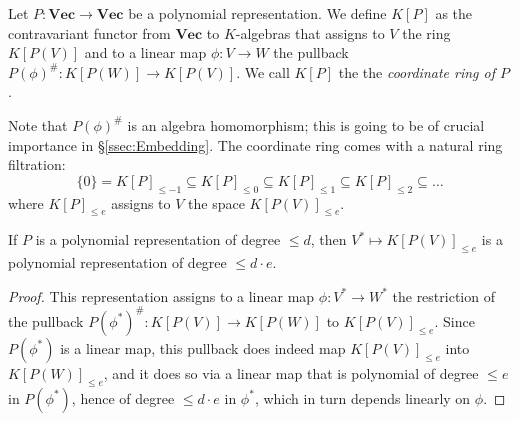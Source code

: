 \documentclass{amsart}
\renewcommand{\Vec}{\mathbf{Vec}}
\begin{document}
\begin{de}
Let $P:\Vec \to \Vec$ be a polynomial representation. We define $K[P]$ as the
contravariant functor from $\Vec$ to $K$-algebras that assigns to $V$
the ring $K[P(V)]$ and to a linear map $\phi:V \to W$ the pullback
$P(\phi)^\#: K[P(W)] \to K[P(V)]$. We call $K[P]$ the 
the {\em coordinate ring of $P$}. 
\end{de}

Note that $P(\phi)^\#$ is an algebra homomorphism; this is
going to be of crucial importance in \S\ref{ssec:Embedding}. 
The coordinate ring comes with a natural ring filtration:
\[ \{0\}=K[P]_{\leq -1} \subseteq K[P]_{\leq 0} \subseteq K[P]_{\leq
1} \subseteq K[P]_{\leq 2} \subseteq \dots \]
where $K[P]_{\leq e}$ assigns to $V$ the space $K[P(V)]_{\leq e}$. 

\begin{lm} \label{lm:Dual}
If $P$ is a polynomial representation of degree $\leq d$, then $V^* \mapsto
K[P(V)]_{\leq e}$ is a polynomial representation of degree $\leq d \cdot e$.
\end{lm}

\begin{proof}
This representation assigns to a linear map $\phi:V^* \to W^*$ the restriction
of the pullback $P(\phi^*)^\# : K[P(V)] \to K[P(W)]$ to $K[P(V)]_{\leq
e}$. Since $P(\phi^*)$ is a linear map, this pullback does indeed map
$K[P(V)]_{\leq e}$ into $K[P(W)]_{\leq e}$, and it does so via a linear
map that is polynomial of degree $\leq e$ in $P(\phi^*)$, hence of degree
$\leq d \cdot e$ in $\phi^*$, which in turn depends linearly on $\phi$.
\end{proof}
\end{document}
